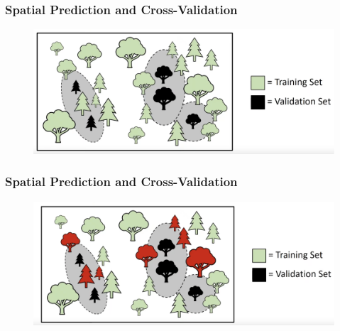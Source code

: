\documentclass[
  shownotes,
  xcolor={svgnames},
  hyperref={colorlinks,citecolor=DarkBlue,linkcolor=andesred,urlcolor=DarkBlue}
  , aspectratio=169]{beamer}
\begin{document}
\begin{frame}[fragile]
\frametitle{Spatial Prediction and Cross-Validation}

  \begin{minipage}[c]{0.6\linewidth}
        
      \begin{figure}[H] \centering
        \captionsetup{justification=centering}
        \includegraphics[scale=0.3]{figures/spatial_cross/fig08.png}
      \end{figure}
           
    \end{minipage}
    \hfill
    \begin{minipage}[t]{0.35\linewidth}%
    

    \end{minipage}

\end{frame}
\begin{frame}[fragile]
\frametitle{Spatial Prediction and Cross-Validation}

  \begin{minipage}[c]{0.6\linewidth}
        
      \begin{figure}[H] \centering
        \captionsetup{justification=centering}
        \includegraphics[scale=0.3]{figures/spatial_cross/fig09.png}
      \end{figure}
           
    \end{minipage}
    \hfill
    \begin{minipage}[t]{0.35\linewidth}%
    

    \end{minipage}

\end{frame}
\end{document}
